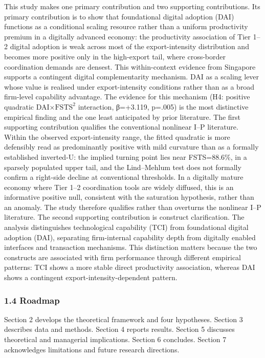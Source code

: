 \documentclass[12pt,a4paper]{article}
\begin{document}
This study makes one primary contribution and two supporting
contributions. Its primary contribution is to show that foundational
digital adoption (DAI) functions as a conditional scaling resource
rather than a uniform productivity premium in a digitally advanced
economy: the productivity association of Tier 1--2 digital adoption is
weak across most of the export-intensity distribution and becomes more
positive only in the high-export tail, where cross-border coordination
demands are densest. This within-context evidence from Singapore
supports a contingent digital complementarity mechanism. DAI as a
scaling lever whose value is realised under export-intensity conditions
rather than as a broad firm-level capability advantage. The evidence for
this mechanism (H4: positive quadratic DAI×\(\mathrm{FSTS}^2\)
interaction, β=+3.119, p=.005) is the most distinctive empirical finding
and the one least anticipated by prior literature. The first supporting
contribution qualifies the conventional nonlinear I--P literature.
Within the observed export-intensity range, the fitted quadratic is more
defensibly read as predominantly positive with mild curvature than as a
formally established inverted-U: the implied turning point lies near
FSTS=88.6\%, in a sparsely populated upper tail, and the Lind--Mehlum
test does not formally confirm a right-side decline at conventional
thresholds. In a digitally mature economy where Tier 1--2 coordination
tools are widely diffused, this is an informative positive null,
consistent with the saturation hypothesis, rather than an anomaly. The
study therefore qualifies rather than overturns the nonlinear I--P
literature. The second supporting contribution is construct
clarification. The analysis distinguishes technological capability (TCI)
from foundational digital adoption (DAI), separating firm-internal
capability depth from digitally enabled interfaces and transaction
mechanisms. This distinction matters because the two constructs are
associated with firm performance through different empirical patterns:
TCI shows a more stable direct productivity association, whereas DAI
shows a contingent export-intensity-dependent pattern.

\hypertarget{14-roadmap}{%
\subsubsection{1.4 Roadmap}\label{14-roadmap}}

Section 2 develops the theoretical framework and four hypotheses.
Section 3 describes data and methods. Section 4 reports results. Section
5 discusses theoretical and managerial implications. Section 6
concludes. Section 7 acknowledges limitations and future research
directions.
\end{document}

